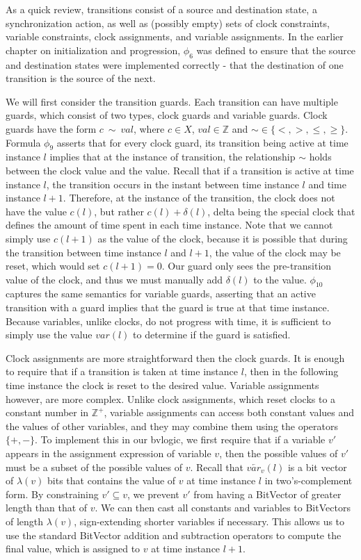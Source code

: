 \documentclass[a4paper,12pt]{article}
\begin{document}
As a quick review, transitions consist of a source and destination state, a
synchronization action, as well as (possibly empty) sets of clock constraints,
variable constraints, clock assignments, and variable assignments. In the
earlier chapter on initialization and progression, \(\phi_6\) was defined to
ensure that the source and destination states were implemented correctly - that
the destination of one transition is the source of the next.


We will first consider the transition guards. Each transition can have multiple
guards, which consist of two types, clock guards and variable guards. Clock
guards have the form \(c\ \sim\ val\), where \(c \in X\), \(val \in
\mathbb{Z}\) and \(\sim \in \{<,>,\leq,\geq\}\). Formula \(\phi_9\) asserts that
for every clock guard, its transition being active at time instance \(l\)
implies that at the instance of transition, the relationship \(\sim\) holds
between the clock value and the value. Recall that if a transition is active at
time instance \(l\), the transition occurs in the instant between time instance
\(l\) and time instance \(l+1\). Therefore, at the instance of the transition,
the clock does not have the value \(c(l)\), but rather \(c(l) + \delta(l)\),
delta being the special clock that defines the amount of time spent in each time
instance. Note that we cannot simply use \(c(l+1)\) as the value of the clock,
because it is possible that during the transition between time instance \(l\)
and \(l+1\), the value of the clock may be reset, which would set \(c(l+1)=0\).
Our guard only sees the pre-transition value of the clock, and thus we must
manually add \(\delta(l)\) to the value.
\(\phi_{10}\) captures the same semantics for variable guards, asserting that an
active transition with a guard implies that the guard is true at that time
instance. Because variables, unlike clocks, do not progress with time, it is
sufficient to simply use the value \(var(l)\) to determine if the guard is satisfied.

Clock assignments are more straightforward then the clock guards. It is enough
to require that if a transition is taken at time instance \(l\), then in the
following time instance the clock is reset to the desired value. Variable
assignments however, are more complex. Unlike clock assignments, which reset
clocks to a constant number in \(\mathbb{Z}^+\), variable assignments can access
both constant values and the values of other variables, and they may combine
them using the operators \(\{+,-\}\). To implement this in our bvlogic, we first
require that if a variable \(v'\) appears in the assignment expression of
variable \(v\), then the possible values of \(v'\) must be a subset of the
possible values of \(v\). Recall that \(\overleftarrow{var_v}(l)\) is a bit
vector of \(\lambda(v)\) bits that contains the value of \(v\) at time instance
\(l\) in two's-complement form. By constraining \(v' \subseteq v\), we prevent
\(v'\) from having a BitVector of greater length than that of \(v\). We can then
cast all constants and variables to BitVectors of length \(\lambda(v)\),
sign-extending shorter variables if necessary. This allows us to use the
standard BitVector addition and subtraction operators to compute the final
value, which is assigned to \(v\) at time instance \(l{+}1\).
\end{document}
